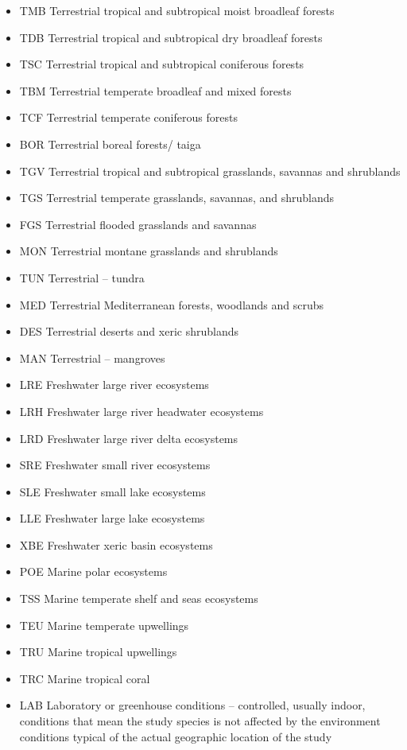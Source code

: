 \documentclass[]{article}
\begin{document}
\begin{itemize}
\item
  TMB Terrestrial tropical and subtropical moist broadleaf forests
\item
  TDB Terrestrial tropical and subtropical dry broadleaf forests
\item
  TSC Terrestrial tropical and subtropical coniferous forests
\item
  TBM Terrestrial temperate broadleaf and mixed forests
\item
  TCF Terrestrial temperate coniferous forests
\item
  BOR Terrestrial boreal forests/ taiga
\item
  TGV Terrestrial tropical and subtropical grasslands, savannas and
  shrublands
\item
  TGS Terrestrial temperate grasslands, savannas, and shrublands
\item
  FGS Terrestrial flooded grasslands and savannas
\item
  MON Terrestrial montane grasslands and shrublands
\item
  TUN Terrestrial -- tundra
\item
  MED Terrestrial Mediterranean forests, woodlands and scrubs
\item
  DES Terrestrial deserts and xeric shrublands
\item
  MAN Terrestrial -- mangroves
\item
  LRE Freshwater large river ecosystems
\item
  LRH Freshwater large river headwater ecosystems
\item
  LRD Freshwater large river delta ecosystems
\item
  SRE Freshwater small river ecosystems
\item
  SLE Freshwater small lake ecosystems
\item
  LLE Freshwater large lake ecosystems
\item
  XBE Freshwater xeric basin ecosystems
\item
  POE Marine polar ecosystems
\item
  TSS Marine temperate shelf and seas ecosystems
\item
  TEU Marine temperate upwellings
\item
  TRU Marine tropical upwellings
\item
  TRC Marine tropical coral
\item
  LAB Laboratory or greenhouse conditions -- controlled, usually indoor,
  conditions that mean the study species is not affected by the
  environment conditions typical of the actual geographic location of
  the study
\end{itemize}
\end{document}
